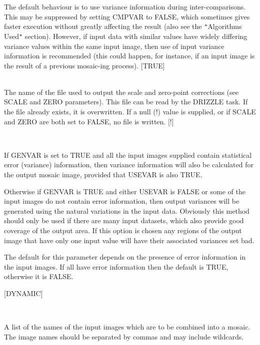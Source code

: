 \documentclass[twoside,11pt]{article}
\renewcommand{\_}{\texttt{\symbol{95}}}
\newcommand{\qt}[1]{{\tt "}#1{\tt "}}
\newcommand{\sstsubsection}[1]{ \item[{#1}] \mbox{} \\}
\newcommand{\sstsubsection}[1]{\item[{#1}]}
\begin{document}
{{{         The default behaviour is to use variance information during
         inter-comparisons. This may be suppressed by setting CMPVAR to
         FALSE, which sometimes gives faster execution without greatly
         affecting the result (also see the \qt{Algorithms Used} section).
         However, if input data with similar values have widely
         differing variance values within the same input image, then use
         of input variance information is recommended (this could
         happen, for instance, if an input image is the result of a
         previous mosaic-ing process).
         [TRUE]
      }
      \sstsubsection{
         CORRECT = LITERAL (Read)
      } {
         The name of the file used to output the scale and zero-point
         corrections (see SCALE and ZERO parameters). This file can be 
         read by the DRIZZLE task.  If the file already exists, it is
         overwritten.  If a null (!) value is supplied, or if SCALE and
         ZERO are both set to FALSE, no file is written.
         [!]
      }
      \sstsubsection{
         GENVAR = \_LOGICAL (Read)
      } {
         If GENVAR is set to TRUE and all the input images supplied
         contain statistical error (variance) information, then
         variance information will also be calculated for the output
         mosaic image, provided that USEVAR is also TRUE.

         Otherwise if GENVAR is TRUE and either USEVAR is FALSE or
         some of the input images do not contain error information, then
         output variances will be generated using the natural
         variations in the input data. Obviously this method should
         only be used if there are many input datasets, which also
         provide good coverage of the output area. If this option is
         chosen any regions of the output image that have only one
         input value will have their associated variances set bad.

         The default for this parameter depends on the presence of error
         information in the input images. If all have error information
         then the default is TRUE, otherwise it is FALSE.

         [DYNAMIC]
      }
      \sstsubsection{
         IN = LITERAL (Read and [optionally] Write)
      } {
         A list of the names of the input images which are to be combined
         into a mosaic. The image names should be separated by commas
         and may include wildcards.

}}}
\end{document}
